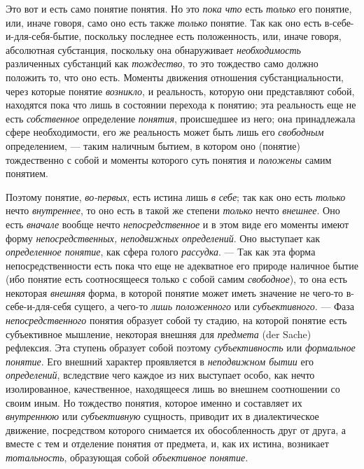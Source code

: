 \documentclass[twoside]{article}
\begin{document}
{{{Это вот и есть само понятие понятия. Но это
{\em пока что} есть
{\em только} его понятие,
или, иначе говоря, само оно есть также
{\em только} понятие. Так
как оно есть в-себе-и-для-себя-бытие, поскольку последнее есть
положенность, или, иначе говоря, абсолютная субстанция, поскольку она
обнаруживает {\em необходимость}
различенных субстанций как
{\em тождество}, то это
тождество само должно положить то, что оно есть. Моменты движения отношения
субстанциальности, через которые понятие
{\em возникло}, и
реальность, которую они представляют собой, находятся пока что лишь в
состоянии перехода к понятию; эта реальность еще не есть
{\em собственное}
определение
{\em понятия},
происшедшее из него; она принадлежала сфере необходимости,
его же реальность может быть лишь его
{\em свободным}
определением, — таким наличным бытием, в
котором оно (понятие) тождественно с собой и моменты которого суть понятия
и {\em положены} самим
понятием.

Поэтому понятие,
{\em во-первых}, есть
истина лишь {\em в себе};
так как оно есть
{\em только} нечто
{\em внутреннее}, то оно
есть в такой же степени {\em только}
нечто {\em внешнее}.
Оно есть {\em вначале}
вообще нечто
{\em непосредственное} и
в этом виде его моменты имеют форму
{\em непосредственных, неподвижных
определений}. Оно выступает как
{\em определенное понятие},
как сфера голого
{\em рассудка}. — Так как
эта форма непосредственности есть пока что еще не адекватное его природе
наличное бытие (ибо понятие есть соотносящееся только с собой самим
{\em свободное}), то она
есть некоторая {\em внешняя}
форма, в которой понятие может иметь значение не чего-то
в-себе-и-для-себя сущего, а чего-то
{\em лишь положенного}
или {\em субъективного}.
— Фаза
{\em непосредственного}
понятия образует собой ту стадию, на которой понятие есть
субъективное мышление, некоторая внешняя для
{\em предмета} (der Sache)
рефлексия. Эта ступень образует собой поэтому
{\em субъективность} или
{\em формальное понятие}.
Его внешний характер проявляется в
{\em неподвижном бытии}
его {\em определений},
вследствие чего каждое из них выступает особо, как нечто
изолированное, качественное, находящееся лишь во внешнем соотношении со
своим иным. Но тождество понятия, которое именно и составляет их
{\em внутреннюю} или
{\em субъективную}
сущность, приводит их в диалектическое движение, посредством
которого снимается их обособленность друг от друга, а вместе с тем и
отделение понятия от предмета, и, как их истина, возникает
{\em тотальность},
образующая собой
{\em объективное понятие}.

}}}
\end{document}
